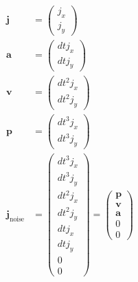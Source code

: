\documentclass{article}
\begin{document}
\begin{align}
  \textbf{j} &= \left(\begin{matrix}j_{x}\\j_{y}\end{matrix}\right) \\
  \textbf{a} &= \left(\begin{matrix}dt j_{x}\\dt j_{y}\end{matrix}\right) \\
  \textbf{v} &= \left(\begin{matrix}dt^{2} j_{x}\\dt^{2} j_{y}\end{matrix}\right) \\
  \textbf{p} &= \left(\begin{matrix}dt^{3} j_{x}\\dt^{3} j_{y}\end{matrix}\right) \\
  \textbf{j}_{\textrm{noise}} &= \left(\begin{matrix}dt^{3} j_{x}\\dt^{3} j_{y}\\dt^{2} j_{x}\\dt^{2} j_{y}\\dt j_{x}\\dt j_{y}\\0\\0\end{matrix}\right)
  = \left(\begin{matrix}
    \textbf{p} \\
    \textbf{v} \\
    \textbf{a} \\
    0 \\
    0
  \end{matrix}\right)
\end{align}
\end{document}
